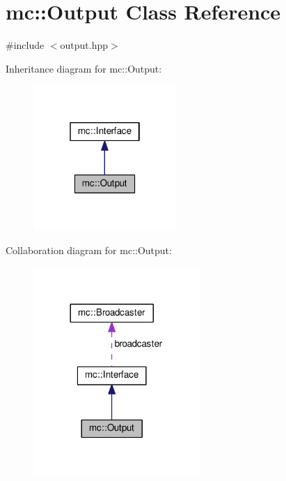 \hypertarget{classmc_1_1Output}{}\section{mc\+:\+:Output Class Reference}
\label{classmc_1_1Output}


{\ttfamily \#include $<$output.\+hpp$>$}



Inheritance diagram for mc\+:\+:Output\+:\nopagebreak
\begin{figure}[H]
\begin{center}
\leavevmode
\includegraphics[width=154pt]{classmc_1_1Output__inherit__graph}
\end{center}
\end{figure}


Collaboration diagram for mc\+:\+:Output\+:\nopagebreak
\begin{figure}[H]
\begin{center}
\leavevmode
\includegraphics[width=180pt]{classmc_1_1Output__coll__graph}
\end{center}
\end{figure}
